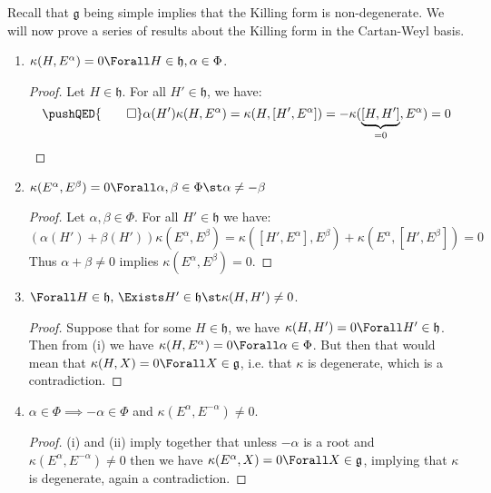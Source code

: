 \documentclass{jknotes}
\begin{document}
Recall that \(\mathfrak{g}\) being simple implies that the Killing form is non-degenerate. We will now prove a series of results about the Killing form in the Cartan-Weyl basis.
\begin{lemma}
    \begin{enumerate}[label=(\roman*)]
        \item \(\kappa(H,E^\alpha) = 0 \Forall H \in \mathfrak{h}, \alpha \in \Phi\).
            \begin{proof}
                Let \(H \in \mathfrak{h}\). For all \(H' \in \mathfrak{h}\), we have:
                \[
                    \pushQED{\qed}
                    \alpha(H') \kappa(H,E^\alpha) = \kappa(H,[H',E^\alpha]) 
                    = -\kappa(\underbrace{[H,H']}_{=0},E^\alpha) 
                    = 0
                    \qedhere
                \]
            \end{proof}
        \item \(\kappa(E^\alpha,E^\beta) = 0 \Forall \alpha,\beta \in \Phi \st \alpha \ne -\beta\)
            \begin{proof}
                Let \(\alpha,\beta\in\Phi\). For all \(H'\in\mathfrak{h}\) we have:
                \begin{equation}
                    (\alpha(H')+\beta(H'))\kappa(E^\alpha,E^\beta) = \kappa([H',E^\alpha],E^\beta) + \kappa(E^\alpha,[H',E^\beta]) = 0
                \end{equation}
                Thus \(\alpha+\beta \ne 0\) implies \(\kappa(E^\alpha,E^\beta) = 0\).
            \end{proof}
        \item \(\Forall H \in \mathfrak{h}, \, \Exists H'\in \mathfrak{h} \st \kappa(H,H') \ne 0\).
            \begin{proof}
                Suppose that for some \(H \in \mathfrak{h}\), we have \(\kappa(H,H')=0 \Forall H' \in \mathfrak{h}\). Then from (i) we have \(\kappa(H,E^\alpha) = 0 \Forall \alpha \in \Phi\). But then that would mean that \(\kappa(H,X) = 0 \Forall X \in \mathfrak{g}\), i.e. that \(\kappa\) is degenerate, which is a contradiction.
            \end{proof}
        \item \(\alpha \in \Phi \implies -\alpha \in \Phi\) and \(\kappa(E^{\alpha},E^{-\alpha}) \ne 0\).
            \begin{proof}
                (i) and (ii) imply together that unless \(-\alpha\) is a root and \(\kappa(E^\alpha,E^{-\alpha}) \ne 0\) then we have \(\kappa(E^\alpha,X) = 0 \Forall X \in \mathfrak{g}\), implying that \(\kappa\) is degenerate, again a contradiction.
            \end{proof}
    \end{enumerate}
\end{lemma}
\end{document}
